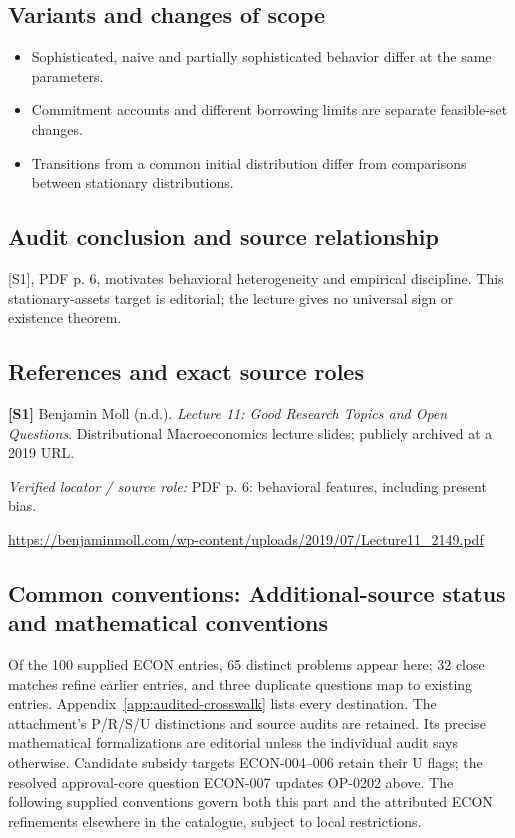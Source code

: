 \documentclass[11pt,a4paper]{article}
\begin{document}
\subsection*{Variants and changes of scope}

\begin{itemize}
\item Sophisticated, naive and partially sophisticated behavior differ at the same parameters.
\item Commitment accounts and different borrowing limits are separate feasible-set changes.
\item Transitions from a common initial distribution differ from comparisons between stationary distributions.
\end{itemize}

\subsection*{Audit conclusion and source relationship}

[S1], PDF p. 6, motivates behavioral heterogeneity and empirical discipline. This stationary-assets target is editorial; the lecture gives no universal sign or existence theorem.

\subsection*{References and exact source roles}

{\footnotesize\raggedright
\par\noindent\textbf{[S1]} Benjamin Moll (n.d.). \emph{Lecture 11: Good Research Topics and Open Questions}. Distributional Macroeconomics lecture slides; publicly archived at a 2019 URL.\par \textit{Verified locator / source role:} PDF p. 6: behavioral features, including present bias.\par \url{https://benjaminmoll.com/wp-content/uploads/2019/07/Lecture11_2149.pdf}\par\smallskip
}

\subsection*{Common conventions: Additional-source status and mathematical conventions}

\label{audited:conventions}

Of the 100 supplied ECON entries, 65 distinct problems appear here; 32 close
matches refine earlier entries, and three duplicate questions map to existing
entries. Appendix~\ref{app:audited-crosswalk} lists every destination.
The attachment's P/R/S/U distinctions and source audits are retained. Its
precise mathematical formalizations are editorial unless the individual audit
says otherwise. Candidate subsidy targets ECON-004--006 retain their U flags;
the resolved approval-core question ECON-007 updates OP-0202 above.
The following supplied conventions govern both this part and the attributed
ECON refinements elsewhere in the catalogue, subject to local restrictions.
\end{document}

